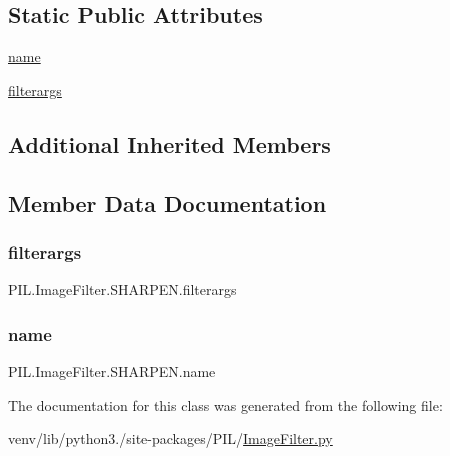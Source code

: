 \subsection*{Static Public Attributes}
\begin{DoxyCompactItemize}
\item 
\hyperlink{classPIL_1_1ImageFilter_1_1SHARPEN_a178467a8c1c9112df8c43eb6d31511e0}{name}
\item 
\hyperlink{classPIL_1_1ImageFilter_1_1SHARPEN_a74d0bc4ddb510cffeda4e3be0f4e344e}{filterargs}
\end{DoxyCompactItemize}
\subsection*{Additional Inherited Members}


\subsection{Member Data Documentation}
\mbox{\label{classPIL_1_1ImageFilter_1_1SHARPEN_a74d0bc4ddb510cffeda4e3be0f4e344e}} 
\subsubsection{\texorpdfstring{filterargs}{filterargs}}
{\footnotesize\ttfamily P\+I\+L.\+Image\+Filter.\+S\+H\+A\+R\+P\+E\+N.\+filterargs\hspace{0.3cm}{\ttfamily [static]}}

\mbox{\label{classPIL_1_1ImageFilter_1_1SHARPEN_a178467a8c1c9112df8c43eb6d31511e0}} 
\subsubsection{\texorpdfstring{name}{name}}
{\footnotesize\ttfamily P\+I\+L.\+Image\+Filter.\+S\+H\+A\+R\+P\+E\+N.\+name\hspace{0.3cm}{\ttfamily [static]}}



The documentation for this class was generated from the following file\+:\begin{DoxyCompactItemize}
\item 
venv/lib/python3./site-\/packages/\+P\+I\+L/\hyperlink{ImageFilter_8py}{Image\+Filter.\+py}\end{DoxyCompactItemize}
